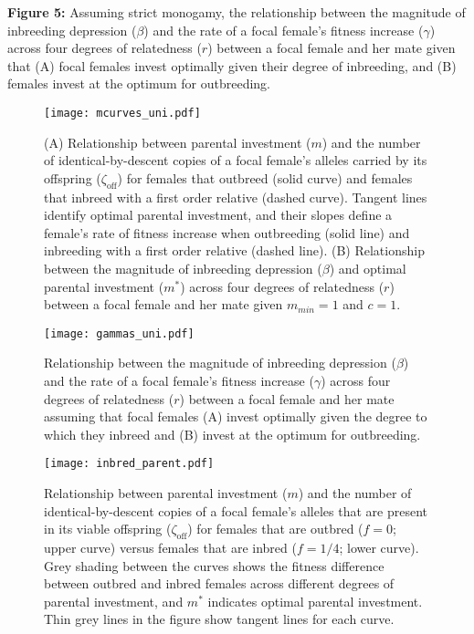 \documentclass[12pt]{article}
\begin{document}
\noindent \textbf{Figure 5:} Assuming strict monogamy, the relationship between the magnitude of inbreeding depression ($\beta$) and the rate of a focal female's fitness increase ($\gamma$) across four degrees of relatedness ($r$) between a focal female and her mate given that (A) focal females invest optimally given their degree of inbreeding, and (B) females invest at the optimum for outbreeding. \\


\clearpage
\begin{figure}
\begin{center}				
\texttt{[image: mcurves\_uni.pdf]}
\end{center}
\caption{(A) Relationship between parental investment ($m$) and the number of identical-by-descent copies of a focal female's alleles carried by its offspring ($\zeta_{\textrm{off}}$) for females that outbreed (solid curve) and females that inbreed with a first order relative (dashed curve). Tangent lines identify optimal parental investment, and their slopes define a female's rate of fitness increase when outbreeding (solid line) and inbreeding with a first order relative (dashed line). (B) Relationship between the magnitude of inbreeding depression ($\beta$) and optimal parental investment ($m^{*}$) across four degrees of relatedness ($r$) between a focal female and her mate given $m_{min}=1$ and $c=1$.}
\label{mcurves_uni}
\end{figure}


\clearpage
\begin{figure}
\begin{center}				
\texttt{[image: gammas\_uni.pdf]}
\end{center}
\caption{Relationship between the magnitude of inbreeding depression ($\beta$) and the rate of a focal female's fitness increase ($\gamma$) across four degrees of relatedness ($r$) between a focal female and her mate assuming that focal females (A) invest optimally given the degree to which they inbreed and (B) invest at the optimum for outbreeding.}
\label{gammas_uni}
\end{figure}


\clearpage
\begin{figure}
\begin{center}				
\texttt{[image: inbred\_parent.pdf]}
\end{center}
\caption{Relationship between parental investment ($m$) and the number of identical-by-descent copies of a focal female's alleles that are present in its viable offspring ($\zeta_{\textrm{off}}$) for females that are outbred ($f=0$; upper curve) versus females that are inbred ($f=1/4$; lower curve). Grey shading between the curves shows the fitness difference between outbred and inbred females across different degrees of parental investment, and $m^{*}$ indicates optimal parental investment. Thin grey lines in the figure show tangent lines for each curve.}
\label{inbred_parent}
\end{figure}
\end{document}
